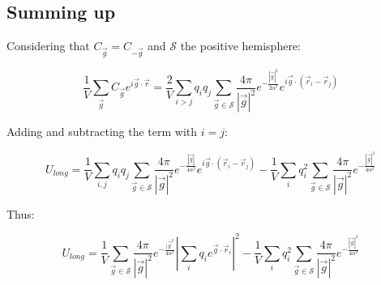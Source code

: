 	\subsection{Summing up}
	Considering that $C_{\vec{g}} = C_{-\vec{g}}$ and $\mathcal{S}$ the positive hemisphere:

	$$\frac{1}{V}\sum\limits_{\vec{g}}C_{\vec{g}}e^{i\vec{g}\cdot\vec{r}} = \frac{2}{V}\sum\limits_{i>j}q_iq_j\sum\limits_{\vec{g}\in\mathcal{S}}\frac{4\pi}{|\vec{g}|^2}e^{-\frac{|\vec{g}|^2}{2\alpha^2}}e^{i\vec{g}\cdot(\vec{r}_i-\vec{r}_j)}$$

	Adding and subtracting the term with $i = j$:

	$$U_{long} = \frac{1}{V}\sum\limits_{i, j}q_iq_j\sum\limits_{\vec{g}\in\mathcal{S}}\frac{4\pi}{|\vec{g}|^2}e^{-\frac{|\vec{g}|}{4\alpha^2}}e^{i\vec{g}\cdot(\vec{r}_i-\vec{r}_j)}-\frac{1}{V}\sum\limits_iq_i^2\sum\limits_{\vec{g}\in\mathcal{S}}\frac{4\pi}{|\vec{g}|^2}e^{-\frac{|\vec{g}|^2}{4\alpha^2}}$$

	Thus:

	$$U_{long} = \frac{1}{V}\sum\limits_{\vec{g}\in\mathcal{S}}\frac{4\pi}{|\vec{g}|^2}e^{-\frac{|\vec{g}^2}{4\alpha^2}}|\sum\limits_{i}q_ie^{\vec{g}\cdot\vec{r}_i}|^2 - \frac{1}{V}\sum\limits_iq_i^2\sum\limits_{\vec{g}\in\mathcal{S}}\frac{4\pi}{|\vec{g}|^2}e^{-\frac{|\vec{g}|^2}{4\alpha^2}}$$
